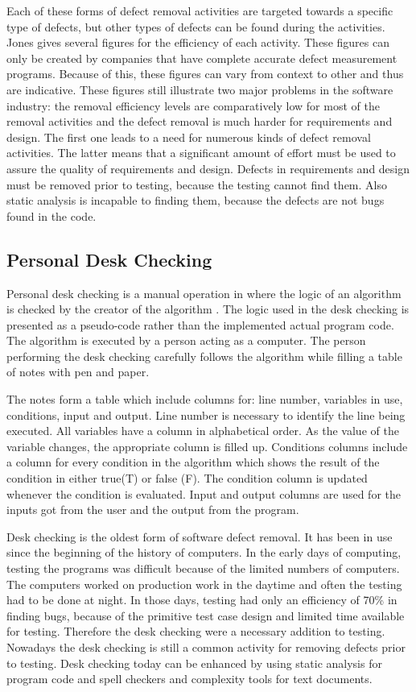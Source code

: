 Each of these forms of defect removal activities are targeted towards a specific type of defects, but other types of defects can be found during the activities. Jones gives several figures for the efficiency of each activity. These figures can only be created by companies that have complete accurate defect measurement programs. Because of this, these figures can vary from context to other and thus are indicative. These figures still illustrate two major problems in the software industry: the removal efficiency levels are comparatively low for most of the removal activities and the defect removal is much harder for requirements and design. The first one leads to a need for numerous kinds of defect removal activities. The latter means that a significant amount of effort must be used to assure the quality of requirements and design. Defects in requirements and design must be removed prior to testing, because the testing cannot find them. Also static analysis is incapable to finding them, because the defects are not bugs found in the code.



\subsection{Personal Desk Checking} 
Personal desk checking is a manual operation in where the logic of an algorithm is checked by the creator of the algorithm . The logic used in the desk checking is presented as a pseudo-code rather than the implemented actual program code. The algorithm is executed by a person acting as a computer. The person performing the desk checking carefully follows the algorithm while filling a table of notes with pen and paper. 

The notes form a table which include columns for: line number, variables in use, conditions, input and output. Line number is necessary to identify the line being executed. All variables have a column in alphabetical order. As the value of the variable changes, the appropriate column is filled up. Conditions columns include a column for every condition in the algorithm which shows the result of the condition in either true(T) or false (F). The condition column is updated whenever the condition is evaluated. Input and output columns are used for the inputs got from the user and the output from the program.~\cite{campionDescCheck}

Desk checking is the oldest form of software defect removal. It has been in use since the beginning of the history of computers. In the early days of computing, testing the programs was difficult because of the limited numbers of computers. The computers worked on production work in the daytime and often the testing had to be done at night. In those days, testing had only an efficiency of 70\% in finding bugs, because of the primitive test case design and limited time available for testing. Therefore the desk checking were a necessary addition to testing. Nowadays the desk checking is still a common activity for removing defects prior to testing. Desk checking today can be enhanced by using static analysis for program code and spell checkers and complexity tools for text documents.

